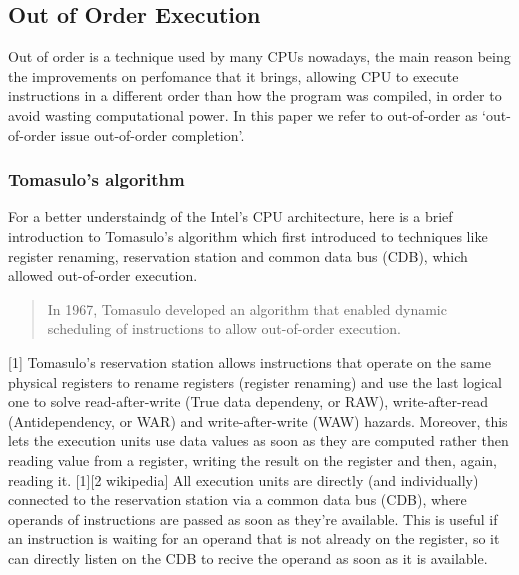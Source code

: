 \subsection{Out of Order Execution}
Out of order is a technique used by many CPUs nowadays, the main reason being the improvements on perfomance that it brings, allowing
CPU to execute instructions in a different order than how the program was compiled, in order to avoid wasting computational power.
In this paper we refer to out-of-order as `out-of-order issue out-of-order completion'.

\subsubsection{Tomasulo's algorithm}
For a better understaindg of the Intel's CPU architecture, here is a brief introduction to Tomasulo's algorithm which
first introduced to techniques like register renaming, reservation station and common data bus (CDB), which allowed
out-of-order execution.

\begin{quote}
    In 1967, Tomasulo developed an algorithm that
    enabled dynamic scheduling of instructions to allow
    out-of-order execution.
\end{quote} [1]
Tomasulo's reservation station allows instructions that operate on the same physical registers to rename registers (register renaming)
and use the last logical one to solve read-after-write (True data dependeny, or RAW), write-after-read (Antidependency, or WAR) and
write-after-write (WAW) hazards. Moreover, this lets the execution units use data values as soon as they are computed rather then reading value from a register,
writing the result on the register and then, again, reading it. [1][2 wikipedia]
All execution units are directly (and individually) connected to the reservation station via a common data bus (CDB), where operands of instructions are
passed as soon as they're available. This is useful if an instruction is waiting for an operand that is not already on the register, so it can directly listen
on the CDB to recive the operand as soon as it is available.

